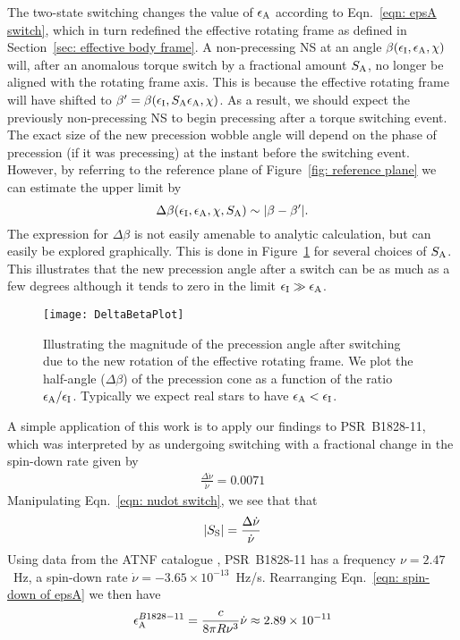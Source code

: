 \documentclass[../full_thesis/full_thesis.tex]{subfiles}
\begin{document}
The two-state switching changes the value of $\epsilon_{\mathrm{A}}$ according to
Eqn.~\eqref{eqn: epsA switch}, which in turn redefined the effective rotating frame
as defined in Section~\ref{sec: effective body frame}. A non-precessing NS at an
angle $\beta(\epsilon_{\mathrm{I}}, \epsilon_{\mathrm{A}}, \chi)$ will, after an anomalous torque switch by a fractional
amount $S_{\mathrm{A}}$, no longer be aligned with the rotating frame axis. This is
because the effective rotating frame will have shifted to $\beta' = \beta(\epsilon_{\mathrm{I}},
S_{\mathrm{A}}\epsilon_{\mathrm{A}}, \chi)$. As a result, we should expect the previously
non-precessing NS to begin precessing after a torque switching event.
The exact size of the new precession wobble angle will depend on the phase of
precession (if it was precessing) at the instant before the switching event.
However, by referring to the reference plane of Figure~\ref{fig: reference plane}
we can estimate the upper limit by
\begin{equation}
    \Delta\beta(\epsilon_{\mathrm{I}}, \epsilon_{\mathrm{A}}, \chi, S_{\mathrm{A}}) \sim |\beta - \beta'|.
\end{equation}
The expression for $\Delta \beta$ is
not easily amenable to analytic calculation, but can easily be explored
graphically.  This is done in Figure~\ref{fig: DeltaBetaPlot} for several choices
of $S_{\mathrm{A}}$. This illustrates that the new precession angle after a switch can be
as much as a few degrees although it tends to zero in the limit $\epsilon_{\mathrm{I}} \gg
\epsilon_{\mathrm{A}}$.
\begin{figure}[htb]
    \centering
    \texttt{[image: DeltaBetaPlot]}
    \caption{Illustrating the magnitude of the precession angle after switching
        due to the new rotation of the effective rotating frame. We plot the half-angle
        ($\Delta\beta$) of the precession cone as a function of the ratio
    $\epsilon_{\mathrm{A}}/\epsilon_{\mathrm{I}}$. Typically we expect real stars to have $\epsilon_{\mathrm{A}} < \epsilon_{\mathrm{I}}$.}
    \label{fig: DeltaBetaPlot}
\end{figure}

A simple application of this work is to apply our findings to PSR~B1828-11,
which was interpreted by \citet{Lyne2010} as undergoing switching with a fractional
change in the spin-down rate given by
\begin{align}
\frac{\Delta\dot{\nu}}{\dot{\nu}} = 0.0071
\end{align}
Manipulating Eqn.~\eqref{eqn: nudot switch}, we see that that
\begin{align}
|S_{\mathrm{S}}| = \frac{\Delta\dot{\nu}}{\dot{\nu}}
\end{align}
Using data from the ATNF catalogue \citep{ATNF}, PSR~B1828-11 has a frequency
$\nu = 2.47$~Hz, a spin-down rate $\dot{\nu}=-3.65\times10^{-13}$~Hz/s.
Rearranging Eqn.~\ref{eqn: spin-down of epsA} we then have
\begin{align}
\epsilon_{\mathrm{A}}^{B1828-11} = \frac{c}{8\pi R\nu^{3}}\dot{\nu} \approx 2.89 \times 10^{-11}
\end{align}
\end{document}
